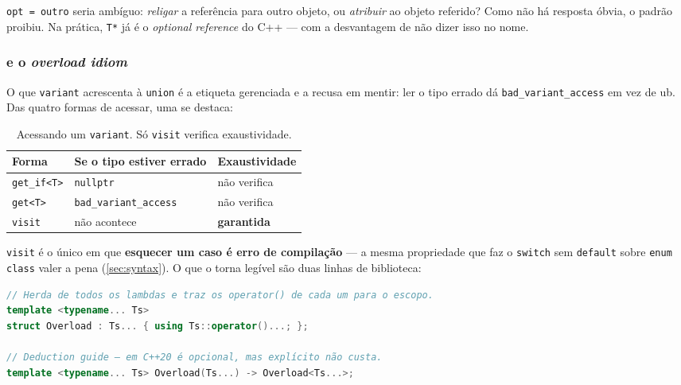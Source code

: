 \begin{porque}
\texttt{opt = outro} seria ambíguo: \emph{religar} a referência para outro
objeto, ou \emph{atribuir} ao objeto referido? Como não há resposta óbvia, o
padrão proibiu. Na prática, \texttt{T*} já é o \emph{optional reference} do
C++ --- com a desvantagem de não dizer isso no nome.
\end{porque}

\subsubsection{ e o \emph{overload idiom}}

O que \texttt{variant} acrescenta à \texttt{union} é a etiqueta gerenciada e a
recusa em mentir: ler o tipo errado dá \texttt{bad\_variant\_access} em vez de
\gls{ub}. Das quatro formas de acessar, uma se destaca:

\begin{table}[htbp]
\centering
\caption{Acessando um \texttt{variant}. Só \texttt{visit} verifica exaustividade.}
\label{tab:variant-acesso}
\footnotesize
\begin{tabular}{@{}lll@{}}
\toprule
\textbf{Forma} & \textbf{Se o tipo estiver errado} & \textbf{Exaustividade} \\
\midrule
\texttt{get\_if<T>} & \texttt{nullptr}               & não verifica \\
\texttt{get<T>}     & \texttt{bad\_variant\_access}  & não verifica \\
\texttt{visit}      & não acontece                   & \textbf{garantida} \\
\bottomrule
\end{tabular}
\end{table}

\texttt{visit} é o único em que \textbf{esquecer um caso é erro de compilação}
--- a mesma propriedade que faz o \texttt{switch} sem \texttt{default} sobre
\texttt{enum class} valer a pena (\cref{sec:syntax}). O que o torna legível são
duas linhas de biblioteca:

\begin{lstlisting}[style=bt, language=C++,
    caption={O \emph{overload idiom}, em
             \texttt{src/vocabulary\_types/demo\_variant.hpp}.}]
// Herda de todos os lambdas e traz os operator() de cada um para o escopo.
template <typename... Ts>
struct Overload : Ts... { using Ts::operator()...; };

// Deduction guide — em C++20 é opcional, mas explícito não custa.
template <typename... Ts> Overload(Ts...) -> Overload<Ts...>;
\end{lstlisting}

